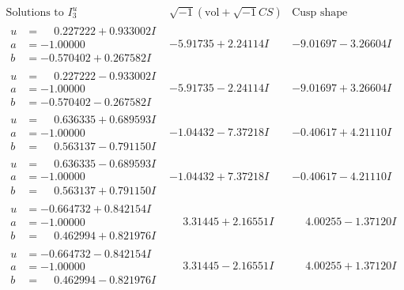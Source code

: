 \documentclass[1p]{elsarticle_modified}
\theoremstyle{definition}
\newcommand{\I}{\sqrt{-1}}
\begin{document}
$$\begin{array}{c|c|c}  
\text{Solutions to }I^u_{3}& \I (\text{vol} + \sqrt{-1}CS) & \text{Cusp shape}\\
 \hline 
\begin{aligned}
u &= \phantom{-}0.227222 + 0.933002 I \\
a &= -1.00000\phantom{ +0.000000I} \\
b &= -0.570402 + 0.267582 I\end{aligned}
 & -5.91735 + 2.24114 I & -9.01697 - 3.26604 I \\ \hline\begin{aligned}
u &= \phantom{-}0.227222 - 0.933002 I \\
a &= -1.00000\phantom{ +0.000000I} \\
b &= -0.570402 - 0.267582 I\end{aligned}
 & -5.91735 - 2.24114 I & -9.01697 + 3.26604 I \\ \hline\begin{aligned}
u &= \phantom{-}0.636335 + 0.689593 I \\
a &= -1.00000\phantom{ +0.000000I} \\
b &= \phantom{-}0.563137 - 0.791150 I\end{aligned}
 & -1.04432 - 7.37218 I & -0.40617 + 4.21110 I \\ \hline\begin{aligned}
u &= \phantom{-}0.636335 - 0.689593 I \\
a &= -1.00000\phantom{ +0.000000I} \\
b &= \phantom{-}0.563137 + 0.791150 I\end{aligned}
 & -1.04432 + 7.37218 I & -0.40617 - 4.21110 I \\ \hline\begin{aligned}
u &= -0.664732 + 0.842154 I \\
a &= -1.00000\phantom{ +0.000000I} \\
b &= \phantom{-}0.462994 + 0.821976 I\end{aligned}
 & \phantom{-}3.31445 + 2.16551 I & \phantom{-}4.00255 - 1.37120 I \\ \hline\begin{aligned}
u &= -0.664732 - 0.842154 I \\
a &= -1.00000\phantom{ +0.000000I} \\
b &= \phantom{-}0.462994 - 0.821976 I\end{aligned}
 & \phantom{-}3.31445 - 2.16551 I & \phantom{-}4.00255 + 1.37120 I \\ \hline\begin{aligned}

\end{aligned}
\end{array}$$
\end{document}
